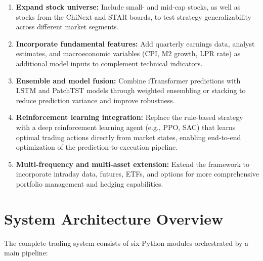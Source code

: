 \documentclass[12pt, a4paper]{article}
\begin{document}
\begin{enumerate}[leftmargin=2em]
    \item \textbf{Expand stock universe:} Include small- and mid-cap stocks, as well as stocks from the ChiNext and STAR boards, to test strategy generalizability across different market segments.
    
    \item \textbf{Incorporate fundamental features:} Add quarterly earnings data, analyst estimates, and macroeconomic variables (CPI, M2 growth, LPR rate) as additional model inputs to complement technical indicators.
    
    \item \textbf{Ensemble and model fusion:} Combine iTransformer predictions with LSTM and PatchTST models through weighted ensembling or stacking to reduce prediction variance and improve robustness.
    
    \item \textbf{Reinforcement learning integration:} Replace the rule-based strategy with a deep reinforcement learning agent (e.g., PPO, SAC) that learns optimal trading actions directly from market states, enabling end-to-end optimization of the prediction-to-execution pipeline.
    
    \item \textbf{Multi-frequency and multi-asset extension:} Extend the framework to incorporate intraday data, futures, ETFs, and options for more comprehensive portfolio management and hedging capabilities.
\end{enumerate}




\appendix
\section{System Architecture Overview}

The complete trading system consists of six Python modules orchestrated by a main pipeline:
\end{document}
